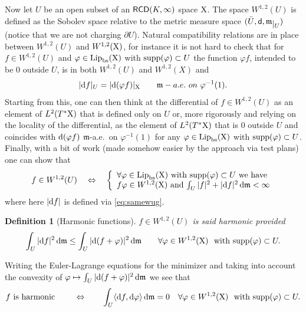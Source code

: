 \documentclass[11pt]{article}
\numberwithin{equation}{section}
\newtheorem{definition}[theorem]{Definition}
\newcommand{\restr}[1]{\lower3pt\hbox{$|_{#1}$}}
\newcommand{\X}{{\rm X}}
\newcommand{\sfd}{{\sf d}}
\newcommand{\mm}{{\mathfrak m}}
\newcommand{\RCD}{{\sf RCD}}
\renewcommand{\d}{{\rm d}}
\newcommand{\Lip}{{\rm Lip}}
\newcommand{\bs}{{\rm bs}}
\newcommand{\supp}{{\rm supp}}
\newcommand\la{\langle}
\newcommand\ra{\rangle}
\begin{document}
Now let $U$ be an open subset of an $\RCD(K,\infty)$ space $\X$. The space $W^{1,2}(U)$ is defined as the Sobolev space relative to the metric measure space $(\bar U,\sfd,\mm\restr U)$ (notice that we are not charging $\partial U$). Natural compatibility relations are in place between $W^{1,2}(U)$ and $W^{1,2}(\X)$, for instance it is not hard to check that for $f\in W^{1,2}(U)$ and $\varphi\in \Lip_\bs(\X)$ with $\supp(\varphi)\subset U$ the function $\varphi f$, intended to be 0 outside $U$, is in both $W^{1,2}(U)$ and $W^{1,2}(X)$ and 
\begin{equation}
\label{eq:samewug}
|\d f|_U=|\d(\varphi f)|_\X\qquad\mm-a.e.\ on\ \varphi^{-1}(1).
\end{equation}
Starting from this, one can then think at the differential of $f\in W^{1,2}(U)$ as an element of $L^2(T^*\X)$ that is defined only on $U$ or, more rigorously and relying on the locality of the differential, as the element of $L^2(T^*\X)$ that is 0 outside $U$ and coincides with $\d(\varphi f)$ $\mm$-a.e.\ on $\varphi^{-1}(1)$ for any $\varphi\in \Lip_\bs(\X)$ with $\supp(\varphi)\subset U$. Finally, with a bit of work (made somehow easier by the approach via test plans) one can show that
\begin{equation}
\label{eq:equivw12u}
f\in W^{1,2}(U)\quad\Leftrightarrow\quad\left\{\begin{array}{l} \forall\varphi\in \Lip_\bs(\X)\text{ with }\supp(\varphi)\subset U\text{ we have }\\
\text{$f\varphi\in W^{1,2}(\X)$ and $\int_U|f|^2+|\d f|^2\,\d\mm<\infty$} \end{array}\right.
\end{equation}
where here $|\d f|$ is defined via \eqref{eq:samewug}. 
\begin{definition}[Harmonic functions]
 $f\in W^{1,2}(U)$  is said harmonic provided 
\begin{equation}
\label{eq:defharm}
\int_U|\d f|^2\,\d\mm\leq \int_U|\d(f+\varphi)|^2\,\d\mm\qquad\forall \varphi\in W^{1,2}(\X)\ \text{ with }\supp(\varphi)\subset U.
\end{equation}
\end{definition} Writing the Euler-Lagrange equations for the minimizer and taking into account  the convexity of $\varphi\mapsto \int_U|\d(f+\varphi)|^2\,\d\mm$ we see that
\begin{equation}
\label{eq:equivharm}
f\text{ is harmonic }\qquad\Leftrightarrow\qquad \int_U\la\d f,\d\varphi\ra\,\d\mm=0\quad \forall \varphi\in W^{1,2}(\X)\ \text{ with }\supp(\varphi)\subset U.
\end{equation}
\end{document}
